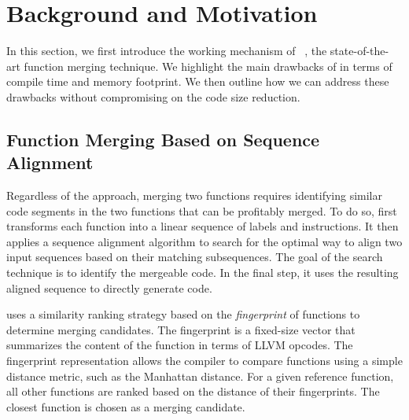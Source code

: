 \section{Background and Motivation} \label{sec:motivation}



In this section, we first introduce the working mechanism of \SOAName~\cite{rocha20}, the state-of-the-art function merging technique. We highlight the main drawbacks of \SOAName in terms of compile time and memory footprint. We then outline how we can address these drawbacks without compromising on the code size reduction. 

\subsection{Function Merging Based on Sequence Alignment}
Regardless of the approach, merging two functions requires identifying similar code segments in the two functions that can be profitably merged.
To do so, \SOAName first transforms each function into a linear sequence of labels and instructions. It then applies a sequence alignment algorithm to search for the optimal way to align two input sequences based on their matching subsequences. The goal of the search technique is to identify the mergeable code. In the final step, it uses the resulting aligned sequence to directly generate code.

\SOAName uses a similarity ranking strategy based on the \textit{fingerprint} of functions to determine merging candidates.  The fingerprint is a fixed-size vector that summarizes the content of the function in terms of LLVM opcodes. The fingerprint representation allows the compiler to compare functions using a simple distance metric, such as the Manhattan distance. For a given reference function, all other functions are ranked based on the distance of their fingerprints. The closest function is chosen as a merging candidate. 

